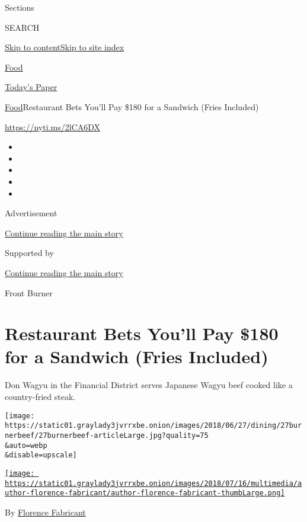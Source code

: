 Sections

SEARCH

\protect\hyperlink{site-content}{Skip to
content}\protect\hyperlink{site-index}{Skip to site index}

\href{https://www.nytimes3xbfgragh.onion/section/food}{Food}

\href{https://myaccount.nytimes3xbfgragh.onion/auth/login?response_type=cookie\&client_id=vi}{}

\href{https://www.nytimes3xbfgragh.onion/section/todayspaper}{Today's
Paper}

\href{/section/food}{Food}\textbar{}Restaurant Bets You'll Pay \$180 for
a Sandwich (Fries Included)

\url{https://nyti.ms/2lCA6DX}

\begin{itemize}
\item
\item
\item
\item
\item
\end{itemize}

Advertisement

\protect\hyperlink{after-top}{Continue reading the main story}

Supported by

\protect\hyperlink{after-sponsor}{Continue reading the main story}

Front Burner

\hypertarget{restaurant-bets-youll-pay-180-for-a-sandwich-fries-included}{%
\section{Restaurant Bets You'll Pay \$180 for a Sandwich (Fries
Included)}\label{restaurant-bets-youll-pay-180-for-a-sandwich-fries-included}}

Don Wagyu in the Financial District serves Japanese Wagyu beef cooked
like a country-fried steak.

\texttt{[image: https://static01.graylady3jvrrxbe.onion/images/2018/06/27/dining/27burnerbeef/27burnerbeef-articleLarge.jpg?quality=75\\\&auto=webp\\\&disable=upscale]}

\href{http://www.nytimes3xbfgragh.onion/by/florence-fabricant}{\texttt{[image: https://static01.graylady3jvrrxbe.onion/images/2018/07/16/multimedia/author-florence-fabricant/author-florence-fabricant-thumbLarge.png]}}

By
\href{http://www.nytimes3xbfgragh.onion/by/florence-fabricant}{Florence
Fabricant}

